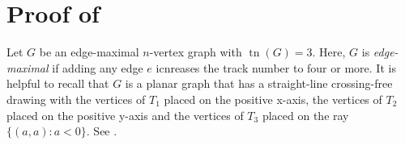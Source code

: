 \documentclass{patmorin}
\DeclareMathOperator{\tr}{tn}
\begin{document}
%
%
%
%
%
%


\section{Proof of }

Let $G$ be an edge-maximal $n$-vertex graph with $\tr(G)=3$.
Here, $G$ is \emph{edge-maximal} if adding any edge $e$ icnreases the track number to four or more. It is
helpful to recall that $G$ is a planar graph that has a straight-line
crossing-free drawing with the vertices of $T_1$ placed on the positive x-axis,
the vertices of $T_2$ placed on the positive y-axis and the vertices of
$T_3$ placed on the ray $\{(a,a):a<0\}$. See .
\end{document}
